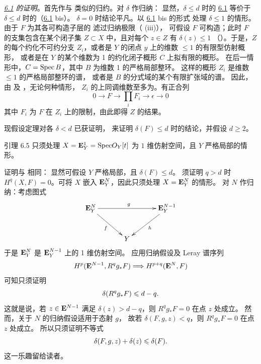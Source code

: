 \medskip
\noindent
\emph{\hyperref[XIX.thm6.1]{6.1} 的证明}。首先作与
 类似的归约。对 $\delta$ 作归纳：
显然，$\delta\leq d$ 时的 \hyperref[XIX.thm6.1]{6.1} 等价于
$\delta\leq d$ 时的（\hyperref[XIX.thm6.1]{6.1} bis）。
$\delta=0$ 时结论平凡。以 \hyperref[XIX.thm6.1]{6.1} bis 的形式
处理 $\delta\leq 1$ 的情形。由于 $F$ 为其各可构造子层的
滤过归纳极限（ (iii)），
可假设 $F$ 可构造；此时 $F$ 的支集包含在某个闭子集
$Z\subset X$ 中，且对每个 $z\in Z$ 有 $\delta(z)\leq 1$
（）。于是，$Z$ 的每个约化不可约分支
$Z_{i}$，或者是 $Y$ 的闭点 $y$ 上的维数 $\leq 1$ 的有限型仿射概形，
或者是在 $Y$ 的某个维数为 1 的约化闭子概形 $C$ 上拟有限的概形。
在后一情形中，$C=\operatorname{Spec} B$，其中 $B$ 为维数 1 的严格局部整环。
这样的概形 $Z_{i}$ 是维数 $\leq 1$ 的严格局部整环的谱，
或者是 $B$ 的分式域的某个有限扩张域的谱。
因此，由  及
，无论何种情形，
$Z_{i}$ 的上同调维数至多为。有正合列
$$
0\longrightarrow F\longrightarrow \prod_{i} F_{i}\longrightarrow
\epsilon \longrightarrow 0
$$
其中 $F_{i}$ 为 $F$ 在 $Z_{i}$ 上的限制，由此即得 $Z$ 的结果。

现假设定理对各 $\delta<d$ 已获证明，
来证明 $\delta(F)\leq d$ 时的结论，并假设 $d\geq 2$。

\hypertarget{sga4.exp.XIX.lemma.6.5}{}\begin{enonce*}{引理 6.5}
只须处理 $X=\mathbf{E}^{1}_{Y}=\protect\mathcal{\operatorname{Spec}}O_{Y}[t]$
为 $1$ 维仿射空间，且 $Y$ 严格局部的情形。
\end{enonce*}

证明与  相同：
显然可假设 $Y$ 严格局部，且 $\delta(F)\leq d$。
须证明 $q>d$ 时 $H^{q}(X,F)=0$。可将 $X$ 嵌入
$\mathbf{E}^{N}_{Y}$，因此只须处理 $X=\mathbf{E}^{N}_{Y}$ 的情形。
对 $N$ 作归纳：考虑图式
$$
\xymatrix@C=1.2cm@R=1cm{
\EE^{N}_Y \ar[rr]^{g} \ar[rd]_{f}&   & \EE^{N-1}_Y \ar[ld]^{h}\\
                     & Y   &  
}
$$
于是 $\mathbf{E}^{N}_{Y}$ 是 $\mathbf{E}^{N-1}_{Y}$ 上的 1 维仿射空间。
应用归纳假设及 Leray 谱序列
$$
H^{p}(\mathbf{E}^{N-1},R^{q}g_{\ast}F)\Longrightarrow
H^{p+q}(\mathbf{E}^{N},F)
$$
可知只须证明
$$
\delta(R^{q}g_{\ast}F)\leqslant d-q{}.
$$
这\pageoriginale 就是说，若 $z\in \mathbf{E}^{N-1}$ 满足
$\delta(z)>d-q$，则 $R^{q}g_{\ast}F=0$ 在点 $z$ 处成立。
然而，关于 $N$ 的归纳假设适用于态射 $g$，
故若 $\delta(F,g,z)<q$，则 $R^{q}g_{\ast}F=0$ 在点 $z$ 处成立。
所以只须证明不等式
$$
\delta(F,g,z)+\delta(z)\leqslant \delta(F){}.
$$
这一乐趣留给读者。

